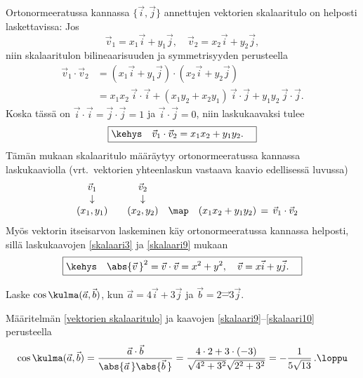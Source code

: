 Ortonormeeratussa kannassa $\{\vec i,\vec j\}$ annettujen vektorien skalaaritulo on helposti
laskettavissa: Jos
\[
\vec v_1 = x_1 \vec i + y_1 \vec j, \quad \vec v_2 = x_2 \vec i + y_2 \vec j,
\]
niin skalaaritulon bilineaarisuuden ja symmetrisyyden perusteella
\begin{align*}
\vec v_1 \cdot \vec v_2 &= (x_1 \vec i + y_1 \vec j) \cdot (x_2 \vec i + y_2 \vec j) \\
                        &= x_1x_2\,\vec i \cdot \vec i + (x_1y_2 + x_2y_1)\,\vec i \cdot \vec j 
                                                       + y_1y_2\,\vec j \cdot \vec j.
\end{align*}
Koska tässä on $\vec i\cdot\vec i=\vec j\cdot\vec j=1$ ja $\vec i\cdot\vec j=0$, niin 
laskukaavaksi tulee
\begin{equation} \label{skalaari9}
\boxed{\kehys\quad \vec v_1\cdot\vec v_2 = x_1x_2 + y_1y_2. \quad}
\end{equation}
Tämän mukaan skalaaritulo määräytyy ortonormeeratussa kannassa laskukaaviolla 
(vrt.\ vektorien yhteenlaskun vastaava kaavio edellisessä luvussa)
\[
\begin{array}{cccccc}
&\vec v_1   &  &\vec v_2   &     & \\
&\downarrow &  &\downarrow &     & \\ 
&(x_1,y_1)  &  &(x_2,y_2)  &\map &(x_1x_2+y_1y_2)\,=\,\vec v_1\cdot\vec v_2
\end{array}
\]
Myös vektorin itseisarvon laskeminen käy ortonormeeratussa kannassa helposti, sillä
laskukaavojen \eqref{skalaari3} ja \eqref{skalaari9} mukaan
\begin{equation} \label{skalaari10}
\boxed{\kehys\quad \abs{\vec v\,}^2= \vec v\cdot\vec v=x^2+y^2, \quad 
                                                \vec v=x\vec i+y\vec j. \quad }
\end{equation}
\begin{Exa} Laske $\cos\kulma(\vec a,\vec b)$, kun $\vec a=4\vec i+3\vec j$ ja
$\vec b=2\vec-3\vec j$.
\end{Exa}
\ratk Määritelmän \ref{vektorien skalaaritulo} ja kaavojen
\eqref{skalaari9}--\eqref{skalaari10} perusteella
\[
\cos\kulma(\vec a,\vec b)=\frac{\vec a\cdot\vec b}{\abs{\vec a\,}\abs{\vec b\,}}
                   =\frac{4\cdot 2+3\cdot(-3)}{\sqrt{4^2+3^2}\sqrt{2^2+3^2}}
                   =-\frac{1}{5\sqrt{13}}\,. \loppu
\]

